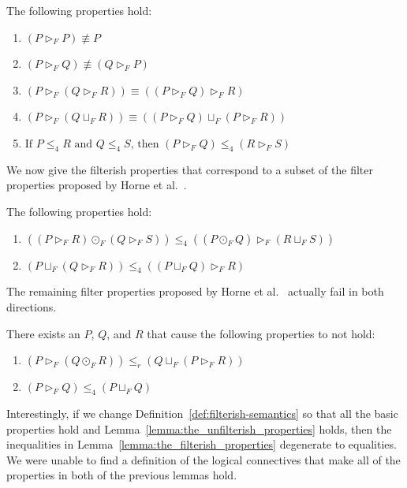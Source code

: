 \documentclass{llncs}
\begin{document}
\begin{lemma}
  \label{lemma:basic_properties_for_parallel}
  The following properties hold:
  \begin{enumerate}
  \item $(P \rhd_F P) \not\equiv P$\\[-5px]
  \item $(P \rhd_F Q) \not\equiv (Q \rhd_F P)$\\[-5px]
  \item $(P \rhd_F (Q \rhd_F R)) \equiv ((P \rhd_F Q) \rhd_F R)$\\[-5px]
  \item $(P \rhd_F (Q \sqcup_F R)) \equiv ((P \rhd_F Q) \sqcup_F (P \rhd_F R))$\\[-5px]
  \item $\text{If }P \leq_4 R \text{ and } Q \leq_4 S \text{, then } (P \rhd_F Q) \leq_4 (R \rhd_F S)$
  \end{enumerate}
\end{lemma}
We now give the filterish properties that correspond to a subset of
the filter properties proposed by Horne et
al.~\cite{horne2017semantics}.
\begin{lemma}
  \label{lemma:the_filterish_properties}
  The following properties hold:
  \begin{enumerate}
  \item $((P \rhd_F R) \odot_F (Q \rhd_F S)) \leq_4 ((P \odot_F Q) \rhd_F (R \sqcup_F S))$\\[-5px]
  \item $(P \sqcup_F (Q \rhd_F R)) \leq_4 ((P \sqcup_F Q) \rhd_F R)$
  \end{enumerate}
\end{lemma}
The remaining filter properties proposed by Horne et
al.~\cite{horne2017semantics} actually fail in both directions.
\begin{lemma}
  \label{lemma:the_unfilterish_properties}
  There exists an $P$, $Q$, and $R$ that cause the following
  properties to not hold:
  \begin{enumerate}
  \item $(P \rhd_F (Q \odot_F R)) \leq_r (Q \sqcup_F (P \rhd_F R))$\\[-5px]
  \item $(P \rhd_F Q) \leq_4 (P \sqcup_F Q)$
  \end{enumerate}
\end{lemma}
Interestingly, if we change Definition~\ref{def:filterish-semantics}
so that all the basic properties hold and
Lemma~\ref{lemma:the_unfilterish_properties} holds, then the
inequalities in Lemma~\ref{lemma:the_filterish_properties} degenerate
to equalities.  We were unable to find a definition of the logical
connectives that make all of the properties in both of the previous
lemmas hold.
\end{document}
